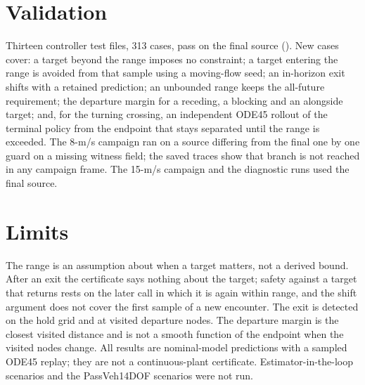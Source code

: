 \documentclass[11pt]{article}
\begin{document}
\section{Validation}
Thirteen controller test files, 313 cases, pass on the final source
(). New cases cover: a target beyond the range imposes no
constraint; a target entering the range is avoided from that sample using a
moving-flow seed; an in-horizon exit shifts with a retained prediction; an
unbounded range keeps the all-future requirement; the departure margin for a
receding, a blocking and an alongside target; and, for the turning crossing,
an independent ODE45 rollout of the terminal policy from the endpoint that
stays separated until the range is exceeded. The 8-m/s campaign ran on a
source differing from the final one by one guard on a missing witness field;
the saved traces show that branch is not reached in any campaign frame. The
15-m/s campaign and the diagnostic runs used the final source.

\section{Limits}
The range is an assumption about when a target matters, not a derived bound.
After an exit the certificate says nothing about the target; safety against a
target that returns rests on the later call in which it is again within
range, and the shift argument does not cover the first sample of a new
encounter. The exit is detected on the hold grid and at visited departure
nodes. The departure margin is the closest visited distance and is not a
smooth function of the endpoint when the visited nodes change. All results
are nominal-model predictions with a sampled ODE45 replay; they are not a
continuous-plant certificate. Estimator-in-the-loop scenarios and the
PassVeh14DOF scenarios were not run.
\end{document}
